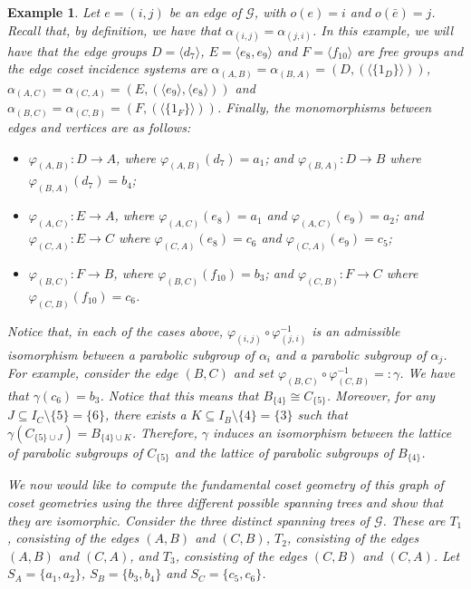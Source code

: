 \documentclass[11pt,letterpaper]{amsart}
\newtheorem{example}[prop]{Example}
\newcommand{\GG}{\mathcal{G}}
\begin{document}
\begin{example}
Let $e=(i,j)$ be an edge of $\GG$, with $o(e)=i$ and $o(\bar{e})=j$. Recall that, by definition, we have that $\alpha_{(i,j)}=\alpha_{(j,i)}$.
In this example, we will have that the edge groups $D=\langle d_{7}\rangle$, $E=\langle e_{8}, e_{9}\rangle$ and $F=\langle f_{10}\rangle$ are free groups and the edge coset incidence systems are
$\alpha_{(A,B)}=\alpha_{(B,A)}= (D,(\langle \{1_D\}\rangle))$, $\alpha_{(A,C)}=\alpha_{(C,A)}=(E,(\langle e_{9}\rangle,\langle e_{8}\rangle))$ and $\alpha_{(B,C)}=\alpha_{(C,B)}=(F ,(\langle \{1_F\}\rangle))$.
Finally, the monomorphisms between edges and vertices are as follows:
\begin{itemize}
    \item $\varphi_{(A,B)}:D\to A$, where $\varphi_{(A,B)}(d_{7})=a_1$; and $\varphi_{(B,A)}:D\to B$ where $\varphi_{(B,A)}(d_{7})=b_4$;
    \item $\varphi_{(A,C)}:E\to A$, where $\varphi_{(A,C)}(e_8)=a_1$ and $\varphi_{(A,C)}(e_9)=a_2$; and $\varphi_{(C,A)}:E\to C$ where $\varphi_{(C,A)}(e_8)=c_{6}$ and $\varphi_{(C,A)}(e_9)=c_{5}$;
    \item $\varphi_{(B,C)}:F\to B$, where $\varphi_{(B,C)}(f_{10})=b_3$; and $\varphi_{(C,B)}:F\to C$ where $\varphi_{(C,B)}(f_{10})=c_{6}$.
\end{itemize}
Notice that, in each of the cases above, $\varphi_{(i,j)}\circ\varphi_{(j,i)}^{-1}$ is an admissible isomorphism between a parabolic subgroup of $\alpha_i$ and a parabolic subgroup of $\alpha_j$.
For example, consider the edge $(B,C)$ and set $\varphi_{(B,C)}\circ\varphi_{(C,B)}^{-1}=:\gamma$. We have that
$\gamma(c_{6})=b_3$. 
Notice that this means that $B_{\{4\}}\cong C_{\{5\}}$.
Moreover, for any $J\subseteq I_C\setminus\{5\} = \{6\}$, there exists a $K\subseteq I_B\setminus \{4\}=\{3\}$ such that 
$\gamma(C_{\{5\}\cup J})= B_{\{4\}\cup K}$.
Therefore, $\gamma$ induces an isomorphism between the lattice of parabolic subgroups of $C_{\{5\}}$ and the lattice of parabolic subgroups of $B_{\{4\}}$.

We now would like to compute the fundamental coset geometry of this graph of coset geometries using the three different possible spanning trees and show that they are isomorphic. Consider the three distinct spanning trees of $\GG$. These are $T_1$, consisting of the edges $(A,B)$ and $(C,B)$, $T_2$, consisting of the edges $(A,B)$ and $(C,A)$, and $T_3$, consisting of the edges $(C,B)$ and $(C,A)$.
Let $S_A=\{a_1,a_2\}$, $S_B=\{b_3,b_4\}$ and $S_C=\{c_5,c_6\}$.


\end{example}
\end{document}
